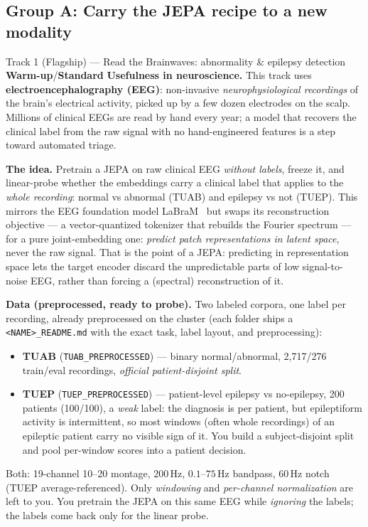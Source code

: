 \documentclass{article}
\newcommand{\code}[1]{\texttt{\small #1}}
\newcommand{\diffeasy}{\colorbox{ebgreen!18}{\textcolor{ebgreen}{\small\bfseries Warm-up}}}
\newcommand{\diffmed}{\colorbox{ebamber!18}{\textcolor{ebamber}{\small\bfseries Standard}}}
\begin{document}
\subsection{Group A: Carry the JEPA recipe to a new modality}

\begin{trackbox}{Track 1 (Flagship) --- Read the Brainwaves: abnormality \& epilepsy detection \hfill \diffeasy{}/\diffmed{}}
\textbf{Usefulness in neuroscience.} This track uses \textbf{electroencephalography
(EEG)}: non-invasive \emph{neurophysiological recordings} of the brain's electrical
activity, picked up by a few dozen electrodes on the scalp. Millions of clinical EEGs
are read by hand every year; a model that recovers the clinical label from the raw
signal with no hand-engineered features is a step toward automated triage.

\smallskip
\textbf{The idea.} Pretrain a JEPA on raw clinical EEG \emph{without labels}, freeze
it, and linear-probe whether the embeddings carry a clinical label that applies to the
\emph{whole recording}: normal vs abnormal (TUAB) and epilepsy vs not (TUEP). This mirrors the EEG
foundation model LaBraM~\citep{LaBraM} but swaps its reconstruction objective --- a
vector-quantized tokenizer that rebuilds the Fourier spectrum --- for a pure
joint-embedding one: \emph{predict patch representations in latent space}, never the raw
signal. That is the point of a JEPA: predicting in representation space lets the target
encoder discard the unpredictable parts of low signal-to-noise EEG, rather than forcing a
(spectral) reconstruction of it.

\smallskip
\textbf{Data (preprocessed, ready to probe).} Two labeled corpora, one label per
recording, already preprocessed on the cluster (each folder ships a
\code{<NAME>\_README.md} with the exact task, label layout, and preprocessing):
\begin{itemize}[leftmargin=1.4em,itemsep=1pt,topsep=2pt]
  \item \textbf{TUAB} (\code{TUAB\_PREPROCESSED}) --- binary normal/abnormal,
    2{,}717/276 train/eval recordings, \emph{official patient-disjoint split}.
  \item \textbf{TUEP} (\code{TUEP\_PREPROCESSED}) --- patient-level epilepsy vs
    no-epilepsy, 200 patients (100/100), a \emph{weak} label: the diagnosis is per
    patient, but epileptiform activity is intermittent, so most windows (often whole
    recordings) of an epileptic patient carry no visible sign of it. You build a
    subject-disjoint split and pool per-window scores into a patient decision.
\end{itemize}
Both: 19-channel 10--20 montage, 200\,Hz, $0.1$--$75$\,Hz bandpass, 60\,Hz notch
(TUEP average-referenced). Only \emph{windowing} and \emph{per-channel
normalization} are left to you. You pretrain the JEPA on this same EEG while
\emph{ignoring} the labels; the labels come back only for the linear probe.


\end{trackbox}
\end{document}
